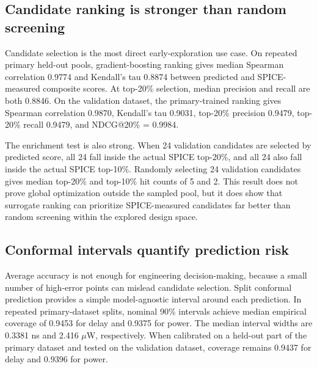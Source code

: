 \documentclass[preprint,12pt]{elsarticle}
\begin{document}
\subsection{Candidate ranking is stronger than random screening}

Candidate selection is the most direct early-exploration use case. On repeated primary held-out pools, gradient-boosting ranking gives median Spearman correlation 0.9774 and Kendall's tau 0.8874 between predicted and SPICE-measured composite scores. At top-20\% selection, median precision and recall are both 0.8846. On the validation dataset, the primary-trained ranking gives Spearman correlation 0.9870, Kendall's tau 0.9031, top-20\% precision 0.9479, top-20\% recall 0.9479, and NDCG@20\% = 0.9984.

The enrichment test is also strong. When 24 validation candidates are selected by predicted score, all 24 fall inside the actual SPICE top-20\%, and all 24 also fall inside the actual SPICE top-10\%. Randomly selecting 24 validation candidates gives median top-20\% and top-10\% hit counts of 5 and 2. This result does not prove global optimization outside the sampled pool, but it does show that surrogate ranking can prioritize SPICE-measured candidates far better than random screening within the explored design space.

\begin{table}[H]
\centering
\caption{Candidate-ranking metrics for primary held-out pools and validation-set screening.}
\label{tab:ranking}
\end{table}

\subsection{Conformal intervals quantify prediction risk}

Average accuracy is not enough for engineering decision-making, because a small number of high-error points can mislead candidate selection. Split conformal prediction provides a simple model-agnostic interval around each prediction. In repeated primary-dataset splits, nominal 90\% intervals achieve median empirical coverage of 0.9453 for delay and 0.9375 for power. The median interval widths are 0.3381 ns and 2.416 $\mu$W, respectively. When calibrated on a held-out part of the primary dataset and tested on the validation dataset, coverage remains 0.9437 for delay and 0.9396 for power.
\end{document}
